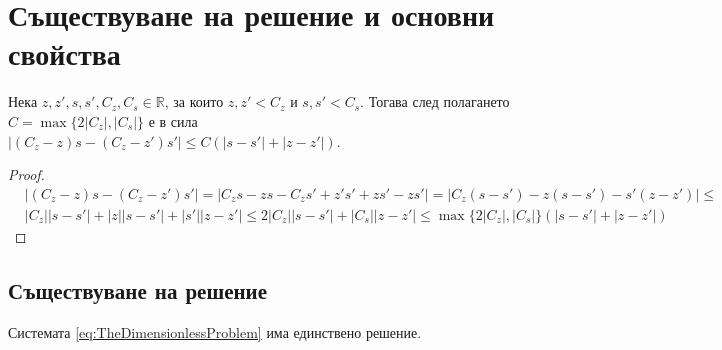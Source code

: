 \section{Съществуване на решение и основни свойства}
\begin{lemma}
  \label{lemma:Modulus}
  Нека $z, z', s, s', C_z, C_s \in \mathbb{R}$, за които $z, z' < C_z$ и $s, s' < C_s$. Тогава след полагането $C = \max\{2 |C_z|, |C_s|\}$ е в сила $|(C_z - z) s - (C_z - z') s'| \leq C (|s-s'| + |z - z'|)$.
\end{lemma}

\begin{proof}
  \begin{equation}
    \begin{split}
      &|(C_z - z) s - (C_z - z') s'| =
      |C_z s - z s - C_z s' + z' s' + z s' - z s'| =
      |C_z (s - s') - z (s - s') - s' (z - z')| \leq \\
      &|C_z| |s - s'| + |z| |s - s'| + |s'| |z - z'| \leq
      2 |C_z| |s - s'|  + |C_s| |z - z'| \leq
      \max\{2 |C_z|, |C_s|\} (|s-s'| + |z - z'|)
    \end{split}
    \end{equation}
    \end{proof}
\subsection{Съществуване на решение}
\begin{proposition}
  \label{prp:EU}
  Системата \ref{eq:TheDimensionlessProblem} има единствено решение.
\end{proposition}

